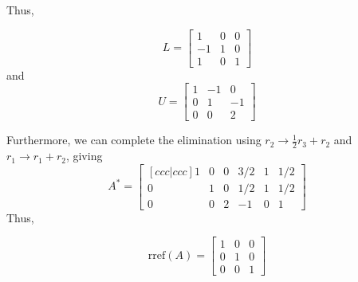 Thus,
\begin{mdframed}[style=MyFrame]
    \begin{equation}
        L =
        \begin{bmatrix}
            1       &   0   &   0    \\
            -1      &   1   &   0   \\
            1       &   0  &   1
        \end{bmatrix}
    \end{equation}
    and
    \begin{equation}
        U =
        \begin{bmatrix}
            1       &   -1  &   0       \\
            0       &   1   &   -1      \\
            0       &   0   &   2
        \end{bmatrix}
    \end{equation}
\end{mdframed}
Furthermore, we can complete the elimination using $r_{2}\rightarrow
\frac{1}{2}r_{3} + r_{2}$ and $r_{1} \rightarrow r_{1} + r_{2}$, giving 
\begin{equation}
    A^{\ast} =
    \begin{bmatrix}[ccc|ccc]
        1       &   0  &   0    &   3/2     &   1   &   1/2   \\
        0       &   1   &  0    &   1/2     &   1   &   1/2   \\
        0       &   0   &   2   &   -1      &   0   &   1
    \end{bmatrix}
\end{equation}
Thus,
\begin{mdframed}[style=MyFrame]
    \begin{equation}
        \text{rref}(A) =
        \begin{bmatrix}
            1       &      0    &   0   \\
            0       &      1    &   0   \\
            0       &      0    &   1
        \end{bmatrix}
    \end{equation}
\end{mdframed}
